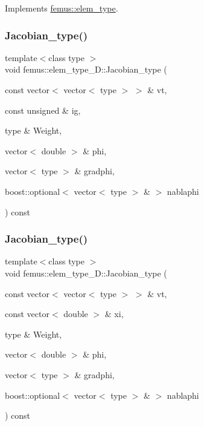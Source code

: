 Implements \mbox{\hyperlink{classfemus_1_1elem__type_aab6db5851a9810adfe0ff98df2c30810}{femus\+::elem\+\_\+type}}.

\mbox{\label{classfemus_1_1elem__type__1_d_af1950c8d96453aafcd57bd254b68a094}} 
\subsubsection{\texorpdfstring{Jacobian\+\_\+type()}{Jacobian\_type()}\hspace{0.1cm}{\footnotesize\ttfamily [1/2]}}
{\footnotesize\ttfamily template$<$class type $>$ \\
void femus\+::elem\+\_\+type\+\_\+D\+::\+Jacobian\+\_\+type (\begin{DoxyParamCaption}\item[{const vector$<$ vector$<$ type $>$ $>$ \&}]{vt,  }\item[{const unsigned \&}]{ig,  }\item[{type \&}]{Weight,  }\item[{vector$<$ double $>$ \&}]{phi,  }\item[{vector$<$ type $>$ \&}]{gradphi,  }\item[{boost\+::optional$<$ vector$<$ type $>$ \& $>$}]{nablaphi }\end{DoxyParamCaption}) const}

\mbox{\label{classfemus_1_1elem__type__1_d_ad6061e34ea1a15f99e49a466987e38e0}} 
\subsubsection{\texorpdfstring{Jacobian\+\_\+type()}{Jacobian\_type()}\hspace{0.1cm}{\footnotesize\ttfamily [2/2]}}
{\footnotesize\ttfamily template$<$class type $>$ \\
void femus\+::elem\+\_\+type\+\_\+D\+::\+Jacobian\+\_\+type (\begin{DoxyParamCaption}\item[{const vector$<$ vector$<$ type $>$ $>$ \&}]{vt,  }\item[{const vector$<$ double $>$ \&}]{xi,  }\item[{type \&}]{Weight,  }\item[{vector$<$ double $>$ \&}]{phi,  }\item[{vector$<$ type $>$ \&}]{gradphi,  }\item[{boost\+::optional$<$ vector$<$ type $>$ \& $>$}]{nablaphi }\end{DoxyParamCaption}) const}

